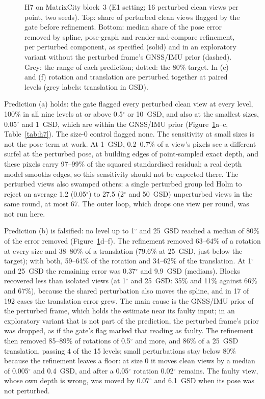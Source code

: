 \begin{figure}[!t]
\centering

\caption{H7 on MatrixCity block~3 (E1 setting; 16 perturbed clean views per point, two seeds). Top: share of
perturbed clean views flagged by the gate before refinement. Bottom: median share of the pose error
removed by spline, pose-graph and render-and-compare refinement, per perturbed component, as specified
(solid) and in an exploratory variant without the perturbed frame's GNSS/IMU prior (dashed). Grey: the
range of each prediction; dotted: the 80\% target. In (c) and (f) rotation and translation are perturbed
together at paired levels (grey labels: translation in GSD).}
\label{fig:h7}
\end{figure}

Prediction (a) holds: the gate flagged every perturbed clean view at every level, 100\% in all nine levels
at or above 0.5$^{\circ}$ or 10~GSD, and also at the smallest sizes, 0.05$^{\circ}$ and 1~GSD, which are within the
GNSS/IMU prior (Figure~\ref{fig:h7}a--c, Table~\ref{tab:h7}). The size-0 control flagged none. The
sensitivity at small sizes is not the pose term at work. At 1~GSD, 0.2--0.7\% of a view's pixels see a
different surfel at the perturbed pose, at building edges of point-sampled exact depth, and these pixels
carry 97--99\% of the squared standardised residual; a real depth model smooths edges, so this sensitivity
should not be expected there. The perturbed views also swamped others: a single perturbed group led Holm to
reject on average 1.2 (0.05$^{\circ}$) to 27.5 (2$^{\circ}$ and 50~GSD) unperturbed views in the same round, at most 67.
The outer loop, which drops one view per round, was not run here.

Prediction (b) is falsified: no level up to 1$^{\circ}$ and 25~GSD reached a median of 80\% of the error
removed (Figure~\ref{fig:h7}d--f). The refinement removed 63--64\% of a rotation at every size and
38--80\% of a translation (79.6\% at 25~GSD, just below the target); with both, 59--64\% of the rotation
and 34--62\% of the translation. At 1$^{\circ}$ and 25~GSD the remaining error was 0.37$^{\circ}$ and 9.9~GSD
(medians). Blocks recovered less than isolated views (at 1$^{\circ}$ and 25~GSD: 35\% and 11\% against 66\%
and 67\%), because the shared perturbation also moves the spline, and in 17 of 192 cases the translation
error grew. The main cause is the GNSS/IMU prior of the perturbed frame, which holds the estimate near its
faulty input; in an exploratory variant that is not part of the prediction, the perturbed frame's prior
was dropped, as if the gate's flag marked that reading as faulty. The refinement then removed 85--89\% of
rotations of 0.5$^{\circ}$ and more, and 86\% of a 25~GSD translation, passing 4 of the 15 levels; small
perturbations stay below 80\% because the refinement leaves a floor: at size 0 it moves clean views by a median
of 0.005$^{\circ}$ and 0.4~GSD, and after a 0.05$^{\circ}$ rotation 0.02$^{\circ}$ remains. The faulty view, whose own
depth is wrong, was moved by 0.07$^{\circ}$ and 6.1~GSD when its pose was not perturbed.

